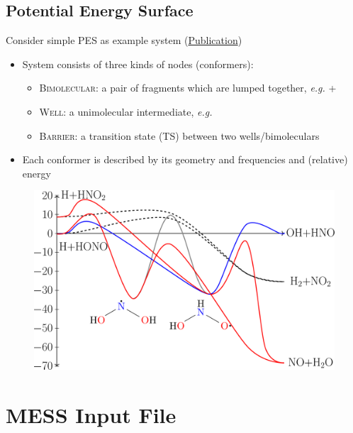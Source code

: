 \documentclass[a4paper,10pt]{article}
\begin{document}
\subsection{ Potential Energy Surface}
Consider simple PES as example system (\href{https://doi.org/10.1016/j.proci.2018.06.208}{Publication}\cite{Fuller.2018})
  \begin{itemize}
   \item System consists of three kinds of nodes (conformers):
    \begin{itemize}
     \item \textsc{Bimolecular}: a pair of fragments which are lumped together, \textit{e.g.} +
     \item \textsc{Well}: a unimolecular intermediate, \textit{e.g.} 
     \item \textsc{Barrier}: a transition state (TS) between two wells/bimoleculars
    \end{itemize}
   \item Each conformer is described by its geometry and frequencies and (relative) energy
  \end{itemize}
  \begin{figure}
    \centering
    \includegraphics[width=0.6\linewidth]{figures/PES_H_HONO_1_lumpHONO.png}
  \end{figure}


\section{MESS Input File}
% 
% 
%
% 
% 
\end{document}
